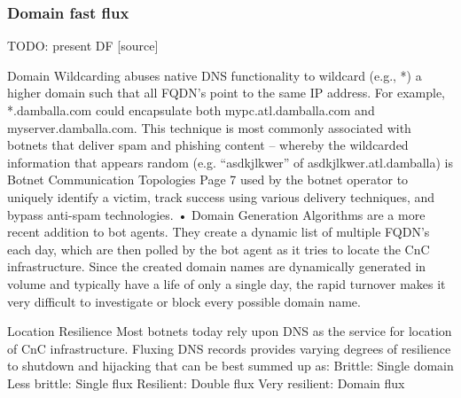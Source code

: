 \subsubsection{Domain fast flux}
TODO: present DF
[source]

Domain Wildcarding 
abuses native DNS functionality to wildcard (e.g., *) a
higher domain such that all FQDN’s point to the same IP address. For example,
*.damballa.com could encapsulate both mypc.atl.damballa.com and
myserver.damballa.com. This technique is most commonly associated with
botnets that deliver spam and phishing content – whereby the wildcarded
information that appears random (e.g. “asdkjlkwer” of asdkjlkwer.atl.damballa) is 
Botnet Communication Topologies
Page 7
used by the botnet operator to uniquely identify a victim, track success using
various delivery techniques, and bypass anti-spam technologies.
• Domain Generation Algorithms 
are a more recent addition to bot agents. They
create a dynamic list of multiple FQDN’s each day, which are then polled by the
bot agent as it tries to locate the CnC infrastructure. Since the created domain
names are dynamically generated in volume and typically have a life of only a
single day, the rapid turnover makes it very difficult to investigate or block every
possible domain name.

   Location Resilience
Most botnets today rely upon DNS as the service for location of CnC infrastructure.
Fluxing DNS records provides varying degrees of resilience to shutdown and hijacking
that can be best summed up as:
Brittle: Single domain
Less brittle: Single flux
Resilient: Double flux
Very resilient: Domain flux
